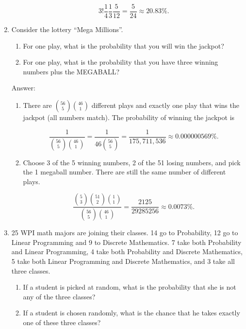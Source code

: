 \documentclass{article}
\begin{document}
\begin{enumerate}
\begin{enumerate}
$$
3! \frac{1}{4}\frac{1}{3}\frac{5}{12} = \frac{5}{24}
\approx 20.83\%.
$$
\end{enumerate}


\item

Consider the lottery “Mega Millions”.

\begin{enumerate}
\item For one play, what is the probability that you will win the jackpot?

\item For one play, what is the probability that you have three winning numbers plus the MEGABALL?
\end{enumerate}

Answer:

\begin{enumerate}
\item There are $\binom{56}{5}\binom{46}{1}$ different plays and exactly one play that wins the jackpot (all numbers match). The probability of winning the jackpot is

$$
\frac{1}{\binom{56}{5}\binom{46}{1}}
= \frac{1}{46\binom{56}{5}}
= \frac{1}{175, 711, 536}
\approx  0.000000569\%.
$$

\item Choose 3 of the 5 winning numbers, 2 of the 51 losing numbers, and pick the 1 megaball number. There are still the same number of different plays. 

$$
\frac{\binom{5}{3}\binom{51}{2}\binom{1}{1}}{\binom{56}{5}\binom{46}{1}}
= \frac{2125}{29285256}
\approx 0.0073\%.
$$

\end{enumerate}

\newpage
\item

25 WPI math majors are joining their classes. 14 go to Probability, 12 go to Linear Programming and 9 to Discrete Mathematics. 7 take both Probability and Linear Programming, 4 take both Probability and Discrete Mathematics, 5 take both Linear Programming and Discrete Mathematics, and 3 take all three classes.

\begin{enumerate}
\item If a student is picked at random, what is the probability that she is not any of the three classes?

\item If a student is chosen randomly, what is the chance that he takes exactly one of these three classes?


\end{enumerate}
\end{enumerate}
\end{document}
